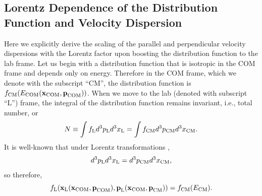 \documentclass[usenatbib,iop,apj,numberedappendix]{aeb_emulateapj_2015}
\newcommand\bmath[1] {\mbox{\boldmath$\rm #1$}}
\newcommand{\pmom}{\ensuremath{\bmath{p}}}
\newcommand{\ppos}{\ensuremath{\bmath{x}}}
\newcommand{\fLAB}{\ensuremath{f_{\rm L}}}
\newcommand{\fCM}{\ensuremath{f_{\rm CM}}}
\newcommand{\dVLAB}{\ensuremath{d^3p_{\rm L} d^3x_{\rm L}}}
\newcommand{\dVCM}{\ensuremath{d^3p_{\rm CM} d^3x_{\rm CM}}}
\begin{document}
\begin{appendix}

\section{Lorentz Dependence of the Distribution Function and Velocity Dispersion}
\label{sec:lorentz}

Here we explicitly derive the scaling of the parallel and
perpendicular velocity dispersions with the Lorentz factor upon boosting the
distribution function to the lab frame. Let us begin with a distribution
function that is isotropic in the COM frame and depends only on energy.
Therefore in the COM frame, which we denote with the subscript ``CM'', the distribution
function is  $\fCM(E_{\rm COM}(\ppos_{\rm COM},\pmom_{\rm COM}))$.  When we move to the lab
(denoted with subscript ``L'') frame, the integral of the distribution function remains invariant,
i.e., total number, or
\begin{equation}
 N \equiv \int \fLAB \dVLAB = \int \fCM \dVCM.
\end{equation}
It is well-known that under Lorentz transformations \citep{1975ctf..book.....L}, 
\begin{equation}
 \dVLAB = \dVCM,
\end{equation}
so therefore,
\begin{equation}
  \fLAB(\ppos_{\rm L}(\ppos_{\rm COM},\pmom_{\rm COM}),\pmom_{\rm L}(\ppos_{\rm COM},\pmom_{\rm CM})) = \fCM(E_{\rm CM}).
\end{equation}


\end{appendix}
\end{document}
